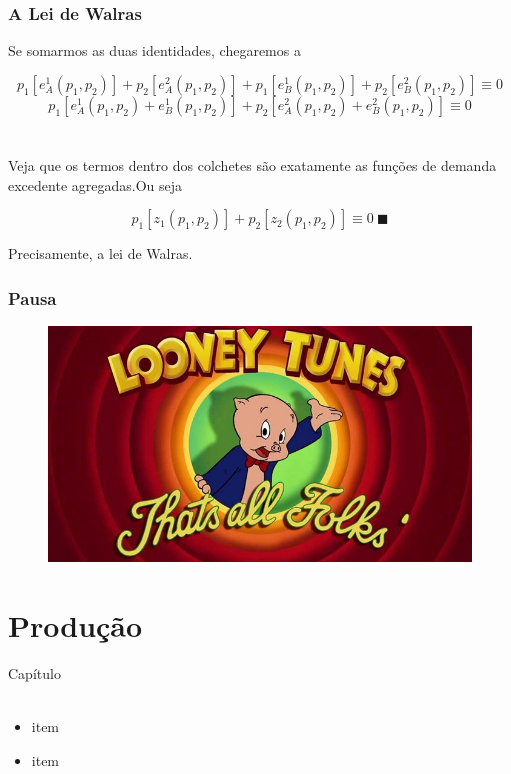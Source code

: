 \documentclass{beamer}[10]
\begin{document}
\begin{frame}
	\frametitle{A Lei de Walras}

	Se somarmos as duas identidades, chegaremos a

	$$p_1[e_A^1(p_1,p_2)] + p_2[e_A^2(p_1,p_2)] + 
	p_1[e_B^1(p_1,p_2)] + p_2[e_B^2(p_1,p_2)] \equiv 0$$
	$$p_1[e_A^1(p_1,p_2) + e_B^1(p_1,p_2)] + p_2[e_A^2(p_1,p_2) + e_B^2(p_1,p_2)] \equiv 0$$
	\\~\\
	Veja que os termos dentro dos colchetes são exatamente as funções de demanda excedente agregadas.Ou seja

	$$p_1[z_1(p_1,p_2)] + p_2[z_2(p_1,p_2) ] \equiv 0 \ \blacksquare$$

	Precisamente, a lei de Walras.

\end{frame}

\begin{frame}
	\frametitle{Pausa}

	\begin{figure}[H]
		\centering
		\colorbox{white}{\includegraphics[scale=0.425]{pausa.png}}
	\end{figure}		

\end{frame}

\section[Produção]{Produção}
\begin{frame}
	\huge Capítulo \normalsize
	\\~\\
	\begin{itemize}
		\item item
		\item item
	\end{itemize}
\end{frame}
\end{document}
